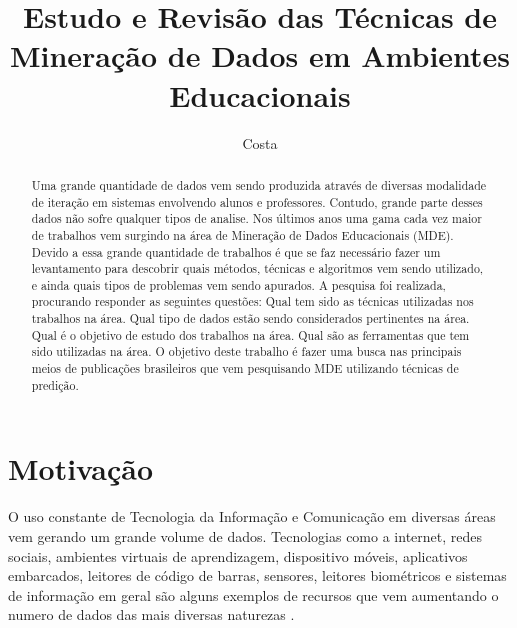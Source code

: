\documentclass[diss-proposta,nocipinfo]{texufpel}
\title{Estudo e Revisão das Técnicas de Mineração de Dados em Ambientes Educacionais}
\author{Costa}{Alexandre Gomes da}
\begin{document}
\maketitle 
\sloppy

\begin{abstract}
Uma grande quantidade de dados vem sendo produzida através de diversas modalidade de iteração em sistemas envolvendo alunos e professores. Contudo, grande parte desses dados não sofre qualquer tipos de analise. Nos últimos anos uma gama cada vez maior de trabalhos vem surgindo na área de Mineração de Dados Educacionais (MDE). Devido a essa grande quantidade de trabalhos é que se faz necessário fazer um levantamento para descobrir quais métodos, técnicas e algoritmos vem sendo utilizado, e ainda quais tipos de problemas vem sendo apurados. A pesquisa foi realizada, procurando responder as seguintes questões: Qual tem sido as técnicas utilizadas nos trabalhos na área. Qual tipo de dados estão sendo considerados pertinentes na área. Qual é o objetivo de estudo dos trabalhos na área. Qual são as ferramentas que tem sido utilizadas na área. O objetivo deste trabalho é fazer uma busca nas principais meios de publicações brasileiros que vem pesquisando MDE utilizando técnicas de predição.
\end{abstract}

\chapter{Motivação}


O uso constante de Tecnologia da Informação e Comunicação em diversas áreas vem gerando um grande volume de dados.
Tecnologias como a internet, redes sociais, ambientes virtuais de aprendizagem, dispositivo móveis, aplicativos embarcados, leitores de código de barras, sensores, leitores biométricos e sistemas de informação em geral são alguns exemplos de recursos que vem aumentando o numero de dados das mais diversas naturezas \cite{goldschmidt2015data}.
\end{document}
